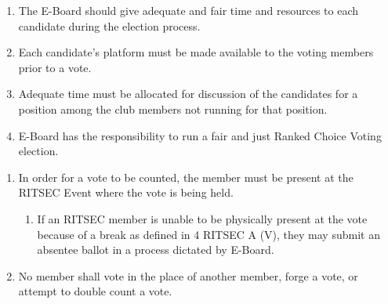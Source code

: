 


\begin{enumerate}
	\item The E-Board should give adequate and fair time and resources to each candidate
	      during the election process.
	\item Each candidate's platform must be made available to the voting members prior to
	      a vote.
	\item Adequate time must be allocated for discussion of the candidates for a position
	      among the club members not running for that position.
	\item E-Board has the responsibility to run a fair and just Ranked Choice Voting
	      election.
\end{enumerate}


\begin{enumerate}
	\item In order for a vote to be counted, the member must be present at the RITSEC
	      Event where the vote is being held.
	      \begin{enumerate}
		      \item If an RITSEC member is unable to be physically present at the vote because of a
		            break as defined in 4 RITSEC A (V), they may submit an absentee ballot in a
		            process dictated by E-Board.
	      \end{enumerate}
	\item No member shall vote in the place of another member, forge a vote, or attempt
	      to double count a vote.
\end{enumerate}


